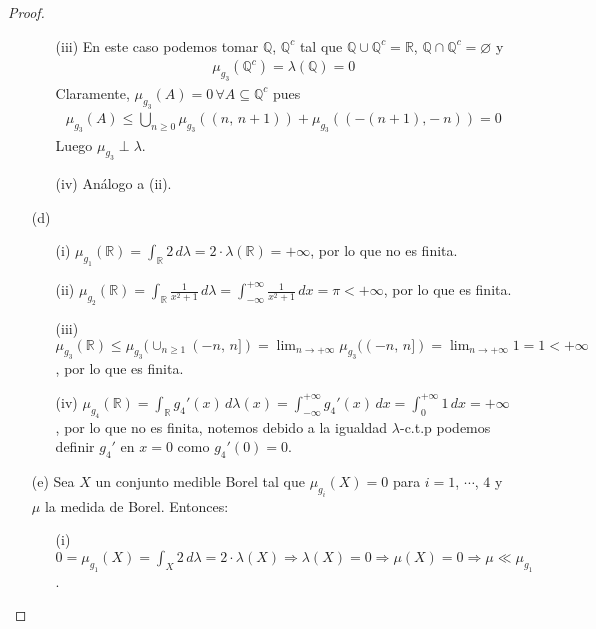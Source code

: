 \documentclass[12pt]{article}
\begin{document}
\begin{proof}
\begin{itemize}
\begin{itemize}
                  \item[(iii)] En este caso podemos tomar $\mathbb{Q}$, $\mathbb{Q}^c$ tal que $\mathbb{Q} \cup \mathbb{Q}^c = \mathbb{R}$, $\mathbb{Q} \cap \mathbb{Q}^c = \varnothing$ y \begin{align*}
                            \mu_{g_3}(\mathbb{Q}^c) = \lambda(\mathbb{Q}) = 0
                        \end{align*}
                        Claramente, $\mu_{g_3}(A) = 0 \, \forall A \subseteq \mathbb{Q}^c$ pues \begin{align*}
                            \mu_{g_3}(A) \leq \bigcup_{n \geq 0} \mu_{g_3}((n\text{, }n+1)) + \mu_{g_3}((-(n+1)\text{,}-n)) = 0
                        \end{align*}
                        Luego $\mu_{g_3} \perp \lambda$.
                  \item[(iv)] Análogo a (ii).
              \end{itemize}
        \item[(d)] \begin{itemize}
                  \item[(i)] $\mu_{g_1}(\mathbb{R}) = \int_{\mathbb{R}} 2 \, d\lambda = 2 \cdot \lambda(\mathbb{R}) = +\infty$, por lo que no es finita.
                  \item[(ii)] $\mu_{g_2}(\mathbb{R}) = \int_{\mathbb{R}} \frac{1}{x^2 + 1} \, d\lambda = \int_{-\infty}^{+\infty} \frac{1}{x^2 + 1} \, dx = \pi < +\infty$, por lo que es finita.
                  \item[(iii)] $\mu_{g_3}(\mathbb{R}) \leq \mu_{g_3}(\cup_{n \geq 1} (-n\text{, }n]) = \lim_{n \to +\infty} \mu_{g_3}((-n\text{, }n]) = \lim_{n \to +\infty} 1 = 1 < +\infty$, por lo que es finita.
                  \item[(iv)] $\mu_{g_4}(\mathbb{R}) = \int_{\mathbb{R}} g_4'(x) \, d\lambda(x) = \int_{-\infty}^{+\infty} g_4'(x) \, dx = \int_{0}^{+\infty} 1 \, dx = +\infty$, por lo que no es finita, notemos debido a la igualdad $\lambda$-c.t.p podemos definir $g_4'$ en $x=0$ como $g_4'(0) = 0$.
              \end{itemize}
        \item[(e)]  Sea $X$ un conjunto medible Borel tal que $\mu_{g_i}(X) = 0$ para $i = 1$, $\cdots$, $4$ y $\mu$ la medida de Borel. Entonces: \begin{itemize}
                  \item[(i)] $0 = \mu_{g_1}(X) = \int_X 2 \, d\lambda = 2 \cdot \lambda(X) \Rightarrow \lambda(X) = 0 \Rightarrow \mu(X) = 0 \Rightarrow \mu \ll \mu_{g_1}$.

\end{itemize}
\end{itemize}
\end{proof}
\end{document}
